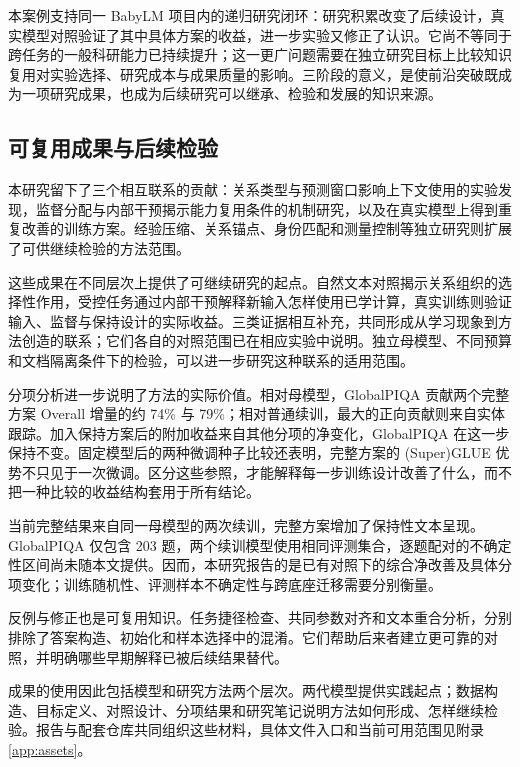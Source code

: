 本案例支持同一 BabyLM 项目内的递归研究闭环：研究积累改变了后续设计，真实模型对照验证了其中具体方案的收益，进一步实验又修正了认识。它尚不等同于跨任务的一般科研能力已持续提升；这一更广问题需要在独立研究目标上比较知识复用对实验选择、研究成本与成果质量的影响。三阶段的意义，是使前沿突破既成为一项研究成果，也成为后续研究可以继承、检验和发展的知识来源。

\subsection{可复用成果与后续检验}

本研究留下了三个相互联系的贡献：关系类型与预测窗口影响上下文使用的实验发现，监督分配与内部干预揭示能力复用条件的机制研究，以及在真实模型上得到重复改善的训练方案。经验压缩、关系锚点、身份匹配和测量控制等独立研究则扩展了可供继续检验的方法范围。

这些成果在不同层次上提供了可继续研究的起点。自然文本对照揭示关系组织的选择性作用，受控任务通过内部干预解释新输入怎样使用已学计算，真实训练则验证输入、监督与保持设计的实际收益。三类证据相互补充，共同形成从学习现象到方法创造的联系；它们各自的对照范围已在相应实验中说明。独立母模型、不同预算和文档隔离条件下的检验，可以进一步研究这种联系的适用范围。

分项分析进一步说明了方法的实际价值。相对母模型，GlobalPIQA 贡献两个完整方案 Overall 增量的约 74\% 与 79\%；相对普通续训，最大的正向贡献则来自实体跟踪。加入保持方案后的附加收益来自其他分项的净变化，GlobalPIQA 在这一步保持不变。固定模型后的两种微调种子比较还表明，完整方案的 (Super)GLUE 优势不只见于一次微调。区分这些参照，才能解释每一步训练设计改善了什么，而不把一种比较的收益结构套用于所有结论。

当前完整结果来自同一母模型的两次续训，完整方案增加了保持性文本呈现。GlobalPIQA 仅包含 203 题，两个续训模型使用相同评测集合，逐题配对的不确定性区间尚未随本文提供。因而，本研究报告的是已有对照下的综合净改善及具体分项变化；训练随机性、评测样本不确定性与跨底座迁移需要分别衡量。

反例与修正也是可复用知识。任务捷径检查、共同参数对齐和文本重合分析，分别排除了答案构造、初始化和样本选择中的混淆。它们帮助后来者建立更可靠的对照，并明确哪些早期解释已被后续结果替代。

成果的使用因此包括模型和研究方法两个层次。两代模型提供实践起点；数据构造、目标定义、对照设计、分项结果和研究笔记说明方法如何形成、怎样继续检验。报告与配套仓库共同组织这些材料，具体文件入口和当前可用范围见附录\ref{app:assets}。
